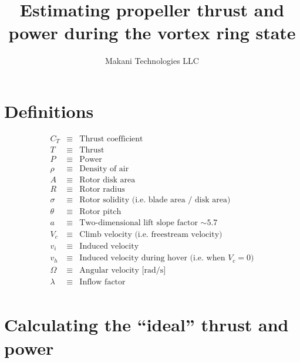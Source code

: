 \documentclass[11pt]{amsart}
\title{Estimating propeller thrust and power during the vortex ring state}
\author{Makani Technologies LLC}
\begin{document}
\maketitle

\section{Definitions}
\begin{eqnarray*}
  C_T &\equiv& \text{Thrust coefficient} \\
  T &\equiv& \text{Thrust} \\
  P &\equiv& \text{Power} \\
  \rho &\equiv& \text{Density of air} \\
  A &\equiv& \text{Rotor disk area} \\
  R &\equiv& \text{Rotor radius} \\
  \sigma &\equiv& \text{Rotor solidity (i.e. blade area / disk area)} \\
  \theta &\equiv& \text{Rotor pitch} \\
  a &\equiv& \text{Two-dimensional lift slope factor $\sim 5.7$} \\
  V_c &\equiv& \text{Climb velocity (i.e. freestream velocity)} \\
  v_i &\equiv& \text{Induced velocity} \\
  v_h &\equiv& \text{Induced velocity during hover (i.e. when $V_c = 0$)} \\
  \Omega &\equiv& \text{Angular velocity [rad/s]} \\
  \lambda &\equiv& \text{Inflow factor} \\
\end{eqnarray*}


\section{Calculating the ``ideal'' thrust and power}
\end{document}
